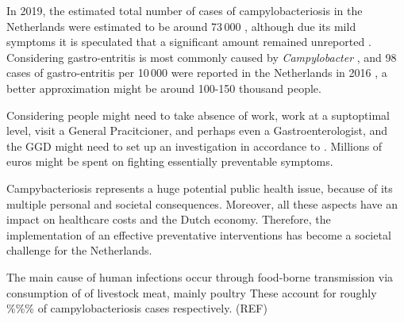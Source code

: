 In 2019, the estimated total number of cases of campylobacteriosis in the Netherlands were estimated to be around 73\,000 \parencite{lagerweij_disease_2020}, although due its mild symptoms it is speculated that a significant amount remained unreported \parencite{koutsoumanis_update_2020}. Considering gastro-entritis is most commonly caused by \textit{Campylobacter} \parencite{fouts_major_2005}, and 98 cases of gastro-entritis per 10\,000 were reported in the Netherlands in 2016 \parencite{van_pelt_jaarraport_2016}, a better approximation might be around 100-150 thousand people.

Considering people might need to take absence of work, work at a suptoptimal level, visit a General Pracitcioner, and perhaps even a Gastroenterologist, and the GGD might need to set up an investigation in accordance to . Millions of euros might be spent on fighting essentially preventable symptoms.

Campybacteriosis represents a huge potential public health issue, because of its multiple personal and societal consequences. Moreover, all these aspects have an impact on healthcare costs and the Dutch economy. Therefore, the implementation of an effective preventative interventions has become a societal challenge for the Netherlands.


The main cause of human infections occur through food-borne transmission via consumption of of livestock meat, mainly poultry\parencite{wilson_tracing_2008} %
These account for roughly \%\%\% of campylobacteriosis cases respectively. (REF)

